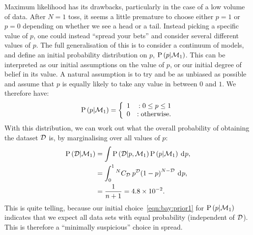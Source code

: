 Maximum likelihood has its drawbacks, particularly in the case of a low volume of data. After \(N=1\) toss, it seems a little premature to choose either \(p=1\) or \(p=0\) depending on whether we see a head or a tail. Instead picking a specific value of \(p\), one could instead ``spread your bets'' and consider several different values of \(p\). The full generalisation of this is to consider a continuum of models, and define an initial probability distribution on \(p\), \(\mathrm{P}\left(p\middle|\mathcal{M}_1\right)\). This can be interpreted as our initial assumptions on the value of \(p\), or our initial degree of belief in its value.
A natural assumption is to try and be as unbiased as possible and assume that \(p\) is equally likely to take any value in between \(0\) and \(1\). We therefore have:
\begin{equation}
  \mathrm{P}\left(p\middle|\mathcal{M}_1\right)=\left\{
  \begin{array}{lr}
    1 &:0\le p\le1\\
    0 &:\text{otherwise.}\\
  \end{array}
  \right.\label{eqn:bay:prior1}
\end{equation}
With this distribution, we can work out what the overall probability of obtaining the dataset \(\mathcal{D}\) is, by marginalising over all values of \(p\):
\begin{align}
  \mathrm{P}\left(\mathcal{D}\middle|\mathcal{M}_1\right) 
  &= \int \mathrm{P}\left(\mathcal{D}\middle|p,\mathcal{M}_1\right)\mathrm{P}\left(p\middle|\mathcal{M}_1\right)\: \operatorname{d}^{}\!{p}, \\
  &= \int_0^1 {^{N}C_{\mathcal{D}}}\: {p}^{\mathcal{D}} {\left(1 - p \right)}^{N-\mathcal{D}}\: \operatorname{d}^{}\!{p}, \\
  &= \frac{1}{n+1} = 4.8\times10^{-2}.
  \label{eqn:bay:marg}
\end{align}
This is quite telling, because our initial choice~\eqref{eqn:bay:prior1} for \(\mathrm{P}\left(p\middle|\mathcal{M}_1\right)\) indicates that we expect all data sets with equal probability (independent of \(\mathcal{D}\)). This is therefore a ``minimally suspicious'' choice in spread.

